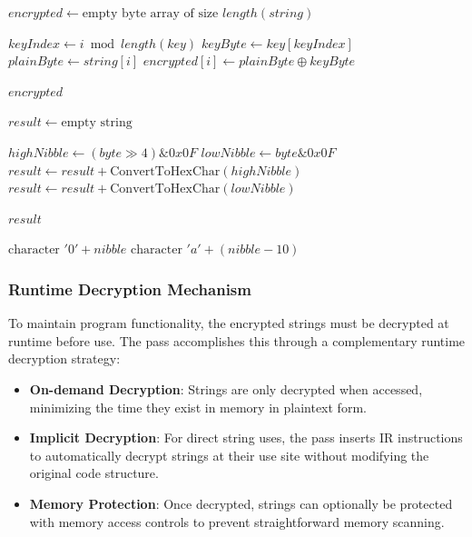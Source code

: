 \documentclass[conference]{IEEEtran}
\begin{document}
\begin{algorithm}[H]
\caption{String Encryption Core Algorithm}
\begin{algorithmic}[1]
    \State $encrypted \gets \text{empty byte array of size } length(string)$
    
        \State $keyIndex \gets i \bmod length(key)$ 
        \State $keyByte \gets key[keyIndex]$
        \State $plainByte \gets string[i]$
        \State $encrypted[i] \gets plainByte \oplus keyByte$ 
    \EndFor
    
    \State \Return $encrypted$
\EndFunction

    \State $result \gets \text{empty string}$
    
        \State $highNibble \gets (byte \gg 4) \& 0x0F$
        \State $lowNibble \gets byte \& 0x0F$
        \State $result \gets result + \text{ConvertToHexChar}(highNibble)$
        \State $result \gets result + \text{ConvertToHexChar}(lowNibble)$
    \EndFor
    
    \State \Return $result$
\EndFunction

        \State \Return $\text{character } '0' + nibble$
    \Else
        \State \Return $\text{character } 'a' + (nibble - 10)$
    \EndIf
\EndFunction
\end{algorithmic}
\end{algorithm}

\subsubsection{Runtime Decryption Mechanism}
To maintain program functionality, the encrypted strings must be decrypted at runtime before use. The pass accomplishes this through a complementary runtime decryption strategy:

\begin{itemize}
    \item \textbf{On-demand Decryption}: Strings are only decrypted when accessed, minimizing the time they exist in memory in plaintext form.
    
    \item \textbf{Implicit Decryption}: For direct string uses, the pass inserts IR instructions to automatically decrypt strings at their use site without modifying the original code structure.
    
    \item \textbf{Memory Protection}: Once decrypted, strings can optionally be protected with memory access controls to prevent straightforward memory scanning.
\end{itemize}
\end{document}
